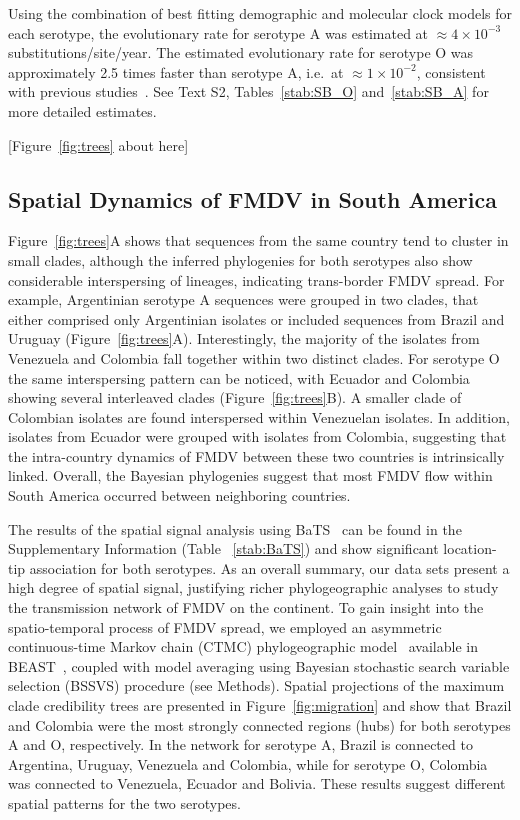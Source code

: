 \documentclass[10pt]{article}
\begin{document}
Using the combination of best fitting demographic and molecular clock models for each serotype, the evolutionary rate for serotype A was estimated at $\approx 4 \times 10^{-3}$ substitutions/site/year.
The estimated evolutionary rate for serotype O was approximately 2.5 times faster than serotype A, i.e.~at $\approx 1 \times 10^{-2}$, consistent with previous studies~\cite{tully, Carvalho2013, Muellner2011}.
See Text S2, Tables~\ref{stab:SB_O} and~\ref{stab:SB_A} for more detailed estimates.

\begin{center}
 [Figure~\ref{fig:trees} about here]
\end{center}


\subsection*{Spatial Dynamics of FMDV in South America}

Figure~\ref{fig:trees}A shows that sequences from the same country tend to cluster in small clades, although the inferred phylogenies for both serotypes also show considerable interspersing of lineages, indicating trans-border FMDV spread.
For example, Argentinian serotype A sequences were grouped in two clades, that either comprised only Argentinian isolates or included sequences from Brazil and Uruguay (Figure~\ref{fig:trees}A).
Interestingly, the majority of the isolates from Venezuela and Colombia fall together within two distinct clades.
For serotype O the same interspersing pattern can be noticed, with Ecuador and Colombia showing several interleaved clades (Figure~\ref{fig:trees}B).
A smaller clade of Colombian isolates are found interspersed within Venezuelan isolates.
In addition, isolates from Ecuador were grouped with isolates from Colombia, suggesting that the intra-country dynamics of FMDV between these two countries is intrinsically linked.
Overall, the Bayesian phylogenies suggest that most FMDV flow within South America occurred between neighboring countries. 

The results of the spatial signal analysis using BaTS~\cite{bats} can be found in the Supplementary Information (Table ~\ref{stab:BaTS}) and show significant location-tip association for both serotypes.
As an overall summary, our data sets present a high degree of spatial signal, justifying richer phylogeographic analyses to study the transmission network of FMDV on the continent.
To gain insight into the spatio-temporal process of FMDV spread, we employed an asymmetric continuous-time Markov chain (CTMC) phylogeographic model~\cite{roots} available in BEAST~\cite{beast2012}, coupled  with model averaging using Bayesian stochastic search variable selection (BSSVS) procedure (see Methods).
Spatial projections of the maximum clade credibility trees are presented in Figure~\ref{fig:migration} and show that Brazil and Colombia were the most strongly connected regions (hubs) for both serotypes A and O, respectively. 
In the network for serotype A, Brazil is connected to Argentina, Uruguay, Venezuela and Colombia, while for serotype O, Colombia was connected to Venezuela, Ecuador and Bolivia.
These results suggest different spatial patterns for the two serotypes.
\end{document}
